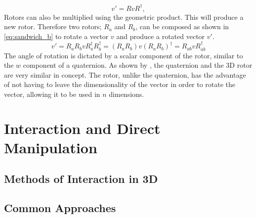 \documentclass{l4proj}
\begin{document}
%
\begin{equation}
  \label{eq:sandwich_a}
    v' = R v R^\dagger,
\end{equation}
%
Rotors can also be multiplied using the geometric product. This will produce a new rotor. Therefore two rotors; $R_a$ and $R_b$, can be composed as shown in \cref{eq:sandwich_b} to rotate a vector \(v\) and produce a rotated vector \(v'\).
%
\begin{equation}
  \label{eq:sandwich_b}
  v' = R_a R_b v R_a^{\dagger} R_b^{\dagger}
   = (R_a R_b) v (R_a R_b)^{\dagger}
   = R_{ab}^{} v R_{ab}^{\dagger}
\end{equation}
%
The angle of rotation is dictated by a scalar component of the rotor, similar to the \(w\) component of a quaternion. 
As shown by \citep{bosch_code_nodate}, the quaternion and the 3D rotor are very similar in concept. The rotor, unlike the quaternion, has the advantage of not having to leave the dimensionality of the vector in order to rotate the vector, allowing it to be used in \(n\) dimensions.

\section{Interaction and Direct Manipulation}

\subsection{Methods of Interaction in 3D}

\subsection*{Common Approaches}
\end{document}
